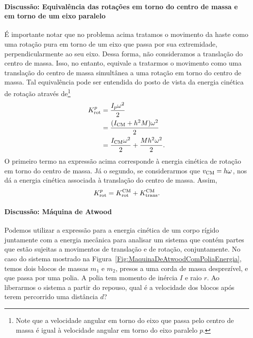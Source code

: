 \paragraph{Discussão: Equivalência das rotações em torno do centro de massa e em torno de um eixo paralelo}

É importante notar que no problema acima tratamos o movimento da haste como uma rotação pura em torno de um eixo que passa por sua extremidade, perpendicularmente ao seu eixo. Dessa forma, não consideramos a translação do centro de massa. Isso, no entanto, equivale a tratarmos o movimento como uma translação do centro de massa simultânea a uma rotação em torno do centro de massa. Tal equivalência pode ser entendida do posto de vista da energia cinética de rotação através de\footnote{Note que a velocidade angular em torno do eixo que passa pelo centro de massa é igual à velocidade angular em torno do eixo paralelo $p$.}
\begin{align}
    K_{\rm{rot}}^p &= \frac{I_p\omega^2}{2} \\
    &= \frac{(I_{\rm{CM}} + h^2M)\omega^2}{2} \\
    &= \frac{I_{\rm{CM}}\omega^2}{2} + \frac{Mh^2\omega^2}{2}.
\end{align}
%
O primeiro termo na expressão acima corresponde à energia cinética de rotação em torno do centro de massa. Já o segundo, se considerarmos que $v_{\rm{CM}} = h\omega$, nos dá a energia cinética associada à translação do centro de massa. Assim,
\begin{equation}
    K_{\rm{rot}}^p = K_{\rm{rot}}^{\rm{CM}} + K_{\rm{trans}}^{\rm{CM}}.
\end{equation}

\paragraph{Discussão: Máquina de Atwood}

Podemos utilizar a expressão para a energia cinética de um corpo rígido juntamente com a energia mecânica para analisar um sistema que contém partes que estão sujeitas a movimentos de translação e de rotação, conjuntamente. No caso do sistema mostrado na Figura~\ref{Fig:MaquinaDeAtwoodComPoliaEnergia}, temos dois blocos de massas $m_1$ e $m_2$, presos a uma corda de massa desprezível, e que passa por uma polia. A polia tem momento de inércia $I$ e raio $r$. Ao liberarmos o sistema a partir do repouso, qual é a velocidade dos blocos após terem percorrido uma distância $d$?

